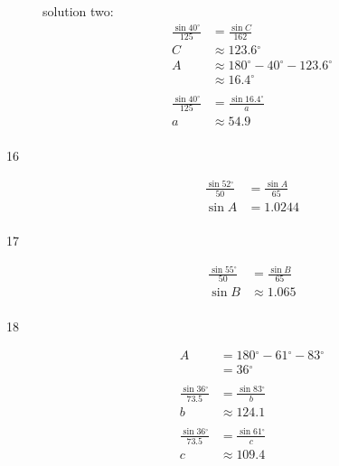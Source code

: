\documentclass{exam}
\newcommand{\dg}{\ensuremath{^\circ}}
\begin{document}
\begin{description}
        solution two:
        \begin{align*}
          \frac{\sin 40 \dg}{125} & = \frac{\sin C}{162} \\
          C                       & \approx \boxed{ 123.6 \dg } \\
          A                       & \approx 180 \dg - 40 \dg - 123.6 \dg \\
                                  & \approx \boxed{ 16.4 \dg } \\
          \\
          \frac{\sin 40 \dg}{125} & = \frac{\sin 16.4 \dg}{a} \\
          a                       & \approx \boxed{ 54.9 } \\
        \end{align*}

      \item[16]
        \begin{align*}
          \frac{\sin 52 \dg}{50} & = \frac{\sin A}{65} \\
          \sin A                 & = 1.0244 \\
        \end{align*}


      \item[17]
        \begin{align*}
          \frac{\sin 55 \dg}{50} &= \frac{\sin B}{65} \\
          \sin B &\approx 1.065 \\
        \end{align*}


      \item[18]
        \begin{align*}
          A & = 180 \dg - 61 \dg - 83 \dg \\
            & = \boxed{ 36 \dg } \\
          \\
          \frac{\sin 36 \dg}{73.5} & = \frac{\sin 83 \dg}{b} \\
          b                        & \approx \boxed{ 124.1 } \\
          \\
          \frac{\sin 36 \dg}{73.5} & = \frac{\sin 61 \dg}{c} \\
          c                        & \approx \boxed{ 109.4 } \\
        \end{align*}


\end{description}
\end{document}
